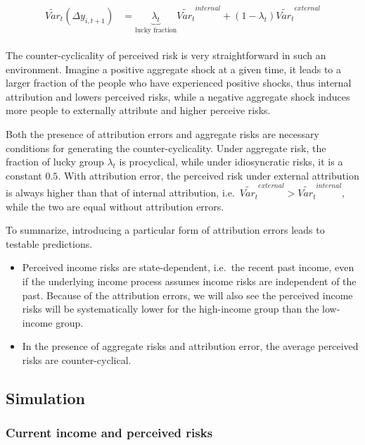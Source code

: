 \documentclass[12pt,notitlepage,onecolumn,aps,pra]{article}
\begin{document}
\begin{eqnarray}
\begin{split}
\tilde {Var}_{t}(\Delta y_{i,t+1}) & = \underbrace{\lambda_t}_{\text{lucky fraction}} \tilde{Var_t}^{internal} + (1-\lambda_t) \tilde{Var_t}^{external} 
\end{split}
\end{eqnarray}

The counter-cyclicality of perceived risk is very straightforward in
such an environment. Imagine a positive aggregate shock at a given time,
it leads to a larger fraction of the people who have experienced
positive shocks, thus internal attribution and lowers perceived risks,
while a negative aggregate shock induces more people to externally
attribute and higher perceive risks.

Both the presence of attribution errors and aggregate risks are
necessary conditions for generating the counter-cyclicality. Under
aggregate risk, the fraction of lucky group \(\lambda_t\) is
procyclical, while under idiosyncratic risks, it is a constant \(0.5\).
With attribution error, the perceived risk under external attribution is
always higher than that of internal attribution,
i.e.~\(\tilde{Var_t}^{external} >\tilde{Var_t}^{internal}\), while the
two are equal without attribution errors.

To summarize, introducing a particular form of attribution errors leads
to testable predictions.

\begin{itemize}
\item
  Perceived income risks are state-dependent, i.e.~the recent past
  income, even if the underlying income process assumes income risks are
  independent of the past. Because of the attribution errors, we will
  also see the perceived income risks will be systematically lower for
  the high-income group than the low-income group.
\item
  In the presence of aggregate risks and attribution error, the average
  perceived risks are counter-cyclical.
\end{itemize}



    \hypertarget{simulation}{%
\subsection{Simulation}\label{simulation}}

\hypertarget{current-income-and-perceived-risks}{%
\subsubsection{Current income and perceived
risks}\label{current-income-and-perceived-risks}}
\end{document}

